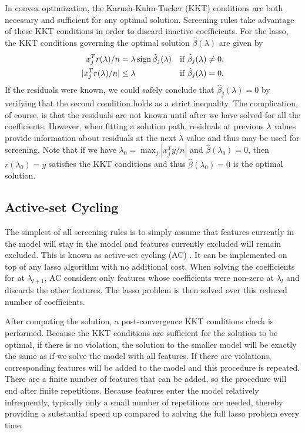 In convex optimization, the Karush-Kuhn-Tucker (KKT) conditions are both necessary and sufficient for any optimal solution.  Screening rules take advantage of these KKT conditions in order to discard inactive coefficients.  For the lasso, the KKT conditions governing the optimal solution $\hat{\beta}(\lambda)$ are given by
\begin{equation}
  \label{eq:kkt}
  \begin{aligned}
    x_j^Tr(\lambda)/n &= \lambda \, \textrm{sign} \, \hat{\beta}_j(\lambda) & & \textrm{if } \hat{\beta}_j(\lambda)\neq 0,\\
    |x_j^Tr(\lambda)/n| &\leq \lambda & & \textrm{if } \hat{\beta}_j(\lambda)= 0.
  \end{aligned}
\end{equation}
If the residuals were known, we could safely conclude that $\hat{\beta}_j(\lambda)=0$ by verifying that the second condition holds as a strict inequality.  The complication, of course, is that the residuals are not known until after we have solved for all the coefficients.  However, when fitting a solution path, residuals at previous $\lambda$ values provide information about residuals at the next $\lambda$ value and thus may be used for screening. Note that if we have $\lambda_0=\max_j|x_j^Ty/n|$ and $\hat{\beta}(\lambda_0)=0$, then $r(\lambda_0)=y$ satisfies the KKT conditions and thus $\hat{\beta}(\lambda_0)=0$ is the optimal solution.

\subsection{Active-set Cycling}
\label{sec:active}

The simplest of all screening rules is to simply assume that features currently in the model will stay in the model and features currently excluded will remain excluded.  This is known as active-set cycling (AC) \citep{lee2007efficient}. It can be implemented on top of any lasso algorithm with no additional cost. When solving the coefficients for at $\lambda_{l+1}$, AC considers only features whose coefficients were non-zero at $\lambda_l$ and discards the other features. The lasso problem is then solved over this reduced number of coefficients.

After computing the solution, a post-convergence KKT conditions check is performed. Because the KKT conditions are sufficient for the solution to be optimal, if there is no violation, the solution to the smaller model will be exactly the same as if we solve the model with all features. If there are violations, corresponding features will be added to the model and this procedure is repeated. There are a finite number of features that can be added, so the procedure will end after finite repetitions. Because features enter the model relatively infrequently, typically only a small number of repetitions are needed, thereby providing a substantial speed up compared to solving the full lasso problem every time.

